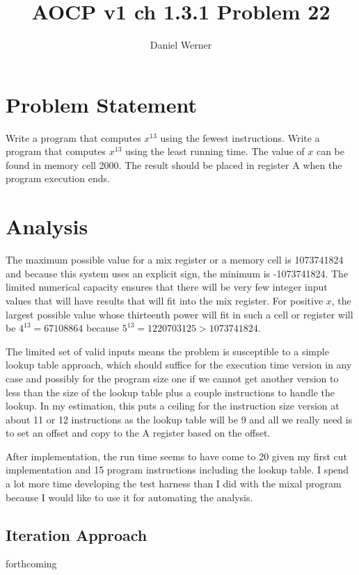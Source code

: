 \documentclass{article}
\title{AOCP v1 ch 1.3.1 Problem 22}
\author{Daniel Werner}
\begin{document}
\maketitle

\section*{
    Problem Statement
}

Write a program that computes $x^{13}$ using the fewest instructions.  Write a
program that computes $x^{13}$ using the least running time.  The value of $x$
can be found in memory cell 2000.  The result should be placed in register A
when the program execution ends.

\section*{
    Analysis
}

The maximum possible value for a mix register or a memory cell
is 1073741824 and because this system uses an explicit sign,
the minimum is -1073741824.  The limited numerical capacity ensures
that there will be very few integer input values that will have
results that will fit into the mix register.  For positive $x$, the largest
possible value whose thirteenth power will fit in such a cell
or register will be $4^{13}=67108864$ because $5^{13}=1220703125 >
1073741824$.

The limited set of valid inputs means the problem is susceptible to a
simple lookup table approach, which should suffice for the
execution time version in any case and possibly for the
program size one if we cannot get another version to less
than the size of the lookup table plus a couple instructions
to handle the lookup.  In my estimation, this puts a ceiling
for the instruction size version at about 11 or 12 instructions
as the lookup table will be 9 and all we really need is to
set an offset and copy to the A register based on the offset.

\par

After implementation, the run time seems to have come to 20 given my
first cut implementation and 15 program instructions including the
lookup table.  I spend a lot more time developing the
test harness than I did with the mixal program because I would like
to use it for automating the analysis.

\subsection* {
  Iteration Approach
}

forthcoming
\end{document}
